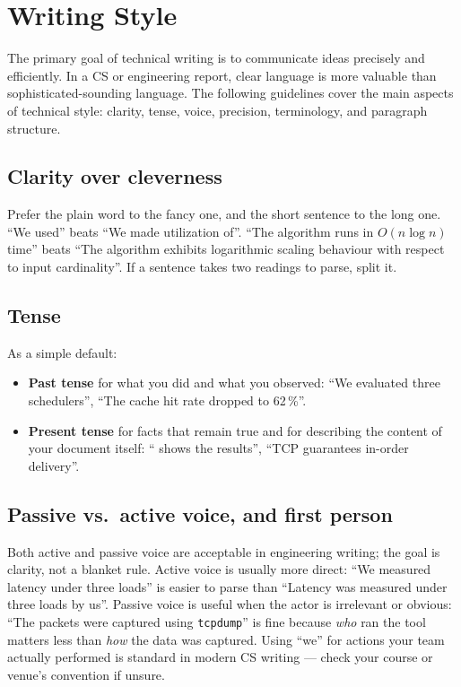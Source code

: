 \section{Writing Style}
\label{sec:style}
The primary goal of technical writing is to communicate ideas precisely
and efficiently. In a CS or engineering report, clear language is more
valuable than sophisticated-sounding language. The following guidelines
cover the main aspects of technical style: clarity, tense, voice, precision,
terminology, and paragraph structure.

\subsection{Clarity over cleverness}
Prefer the plain word to the fancy one, and the short sentence to the
long one. ``We used'' beats ``We made utilization of''. ``The algorithm
runs in $O(n\log n)$ time'' beats ``The algorithm exhibits logarithmic
scaling behaviour with respect to input cardinality''. If a sentence
takes two readings to parse, split it.

\subsection{Tense}
As a simple default:
\begin{itemize}[nosep]
      \item \textbf{Past tense} for what you did and what you observed:
            ``We evaluated three schedulers'', ``The cache hit rate dropped
            to 62\,\%''.
      \item \textbf{Present tense} for facts that remain true and for
            describing the content of your document itself: ``
            shows the results'', ``TCP guarantees in-order delivery''.
\end{itemize}

\subsection{Passive vs.\ active voice, and first person}
Both active and passive voice are acceptable in engineering writing;
the goal is clarity, not a blanket rule. Active voice is usually more
direct: ``We measured latency under three loads'' is easier to parse than
``Latency was measured under three loads by us''. Passive voice is useful
when the actor is irrelevant or obvious: ``The packets were captured
using \texttt{tcpdump}'' is fine because \emph{who} ran the tool matters
less than \emph{how} the data was captured. Using ``we'' for actions your
team actually performed is standard in modern CS writing --- check your
course or venue's convention if unsure.

